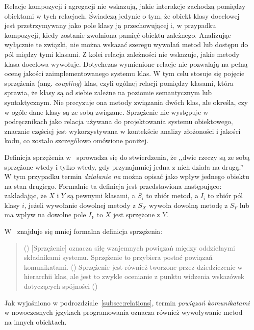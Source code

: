 Relacje kompozycji i agregacji nie wskazują, jakie interakcje zachodzą pomiędzy obiektami w tych relacjach.
Świadczą jedynie o tym, że obiekt klasy docelowej jest przetrzymywany jako pole klasy ją przechowującej i, w
przypadku kompozycji, kiedy zostanie zwolniona pamięć obiektu zależnego.
Analizując wyłącznie te związki, nie można wskazać szeregu wywołań metod lub dostępu do pól między tymi klasami.
Z kolei relacja zależności nie wskazuje, jakie metody klasa docelowa wywołuje.
Dotychczas wymienione relacje nie pozwalają na pełną ocenę jakości zaimplementowanego systemu klas.
W tym celu stosuje się pojęcie sprzężenia (ang. \textit{coupling}) klas, czyli ogólnej relacji pomiędzy klasami, która
sprawia, że klasy są od siebie zależne na poziomie semantycznym lub syntaktycznym.
Nie precyzuje ona metody związania dwóch klas, ale określa, czy w ogóle dane klasy są ze sobą związane.
Sprzężenie nie występuje w podręcznikach jako relacja używana do projektowania systemu obiektowego,
znacznie częściej jest wykorzystywana w kontekście analizy złożoności i jakości kodu, co zostało szczegółowo omówione
poniżej.

Definicja sprzężenia w~\cite{chidamber1991towards} sprowadza się do stwierdzenia, że ,,dwie rzeczy są ze sobą
sprzężone wtedy i tylko wtedy, gdy przynajmniej jedna z nich działa na drugą.''
W tym przypadku termin \textit{działanie na} można opisać jako wpływ jednego obiektu na stan drugiego.
Formalnie ta definicja jest przedstawiona następująco: zakładając, że \(X\) i \(Y\) są pewnymi klasami, a
\(S_{i}\) to zbiór metod, a \(I_{i}\) to zbiór pól klasy \(i\), jeżeli wywołanie dowolnej metody z \(S_{X}\) wywoła
dowolną metodę z \(S_{Y}\) lub ma wpływ na dowolne pole \(I_{Y}\) to \(X\) jest sprzężone z \(Y\).

W~\cite{yourdon1996case:19} znajduje się mniej formalna definicja sprzężenia:
\begin{quote}
(\textellipsis) [Sprzężenie] oznacza siłę wzajemnych powiązań między oddzielnymi składnikami systemu.
Sprzężenie to przybiera postać powiązań komunikatami.
(\textellipsis) Sprzężenie jest również tworzone przez dziedziczenie w hierarchii klas, ale jest to zwykle ocenianie z punktu
widzenia wskazówek dotyczących spójności (\textellipsis)
\end{quote}

Jak wyjaśniono w podrozdziale~\ref{subsec:relations}, termin \textit{powiązań komunikatami} w nowoczesnych językach
programowania oznacza również wywoływanie metod na innych obiektach.

